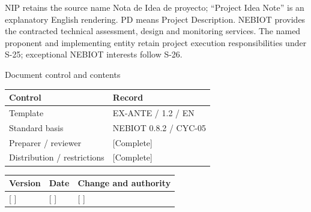 \vspace{2mm}
NIP retains the source name Nota de Idea de proyecto; “Project Idea Note” is an explanatory English rendering. PD means Project Description.
\vspace{2mm}
NEBIOT provides the contracted technical assessment, design and monitoring services. The named proponent and implementing entity retain project execution responsibilities under S-25; exceptional NEBIOT interests follow S-26.
\clearpage
{\fontsize{23}{27}\selectfont\color{NEBGreen}Document control and contents\par}
\vspace{3mm}
{\sffamily\fontsize{8.3}{10.3}\selectfont\begin{longtable}{@{}P{50.55mm} P{117.94mm}@{}}
\toprule
\textbf{Control} & \textbf{Record}\\\midrule\endhead
\rule{0pt}{7.7mm}Template & EX-ANTE / 1.2 / EN\\\hline
\rule{0pt}{7.7mm}Standard basis & NEBIOT 0.8.2 / CYC-05\\\hline
\rule{0pt}{7.7mm}Preparer / reviewer & [Complete]\\\hline
\rule{0pt}{7.7mm}Distribution / restrictions & [Complete]\\\hline
\end{longtable}}
{\sffamily\fontsize{8.3}{10.3}\selectfont\begin{longtable}{@{}P{31.34mm} P{37.94mm} P{95.68mm}@{}}
\toprule
\textbf{Version} & \textbf{Date} & \textbf{Change and authority}\\\midrule\endhead
\rule{0pt}{7.7mm}[ ] & [ ] & [ ]\\\hline
\end{longtable}}
{\sffamily\fontsize{9.5}{11.4}\selectfont\tableofcontents}

